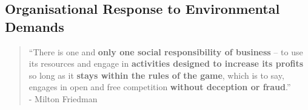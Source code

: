\documentclass[11pt]{article}
\theoremstyle{definition}
\begin{document}
\subsection{Organisational Response to Environmental Demands}

\begin{quote}
	\textquotedblleft There is one and \textbf{only one social responsibility of business} -- to use its resources and engage in \textbf{activities designed to increase its profits} so long as it \textbf{stays within the rules of the game}, which is to say, engages in open and free competition \textbf{without deception or fraud}.\textquotedblright\\
	\hspace*{1em} - Milton Friedman
\end{quote}
\end{document}
